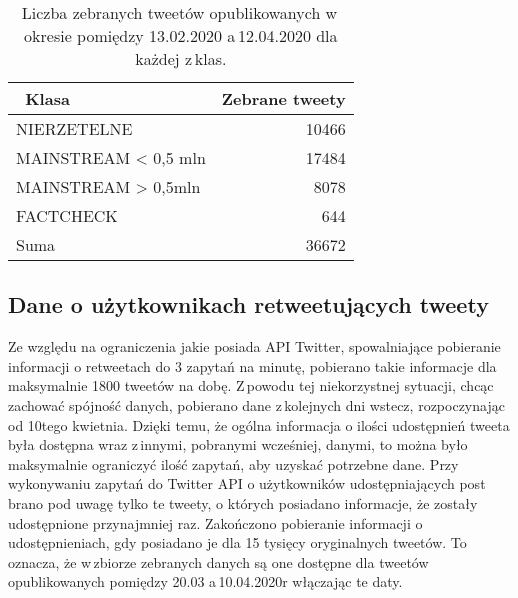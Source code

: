 \begin{table}[!h] \centering
\caption{Liczba zebranych tweetów opublikowanych w\,okresie pomiędzy 13.02.2020 a\,12.04.2020 dla każdej z\,klas.}  \label{tab:zebranetweety}
\begin{tabular}{|l|r|} 
\hline
~Klasa & Zebrane tweety \\ 
\hline \hline
NIERZETELNE & 10466 \\ 
\hline
MAINSTREAM \textless{} 0,5 mln & 17484 \\ 
\hline
MAINSTREAM \textgreater{} 0,5mln & 8078 \\ 
\hline
FACTCHECK & 644 \\
\hline 
Suma & 36672 \\
\hline 
\end{tabular}

\end{table}

\subsection{Dane o użytkownikach retweetujących tweety}
Ze względu na ograniczenia jakie posiada API Twitter, spowalniające pobieranie informacji o retweetach do 3 zapytań na minutę, pobierano takie informacje dla maksymalnie 1800 tweetów na dobę. Z\,powodu tej niekorzystnej sytuacji, chcąc zachować spójność danych, pobierano dane z\,kolejnych dni wstecz, rozpoczynając od 10tego kwietnia. Dzięki temu, że ogólna informacja o ilości udostępnień tweeta była dostępna wraz z\,innymi, pobranymi wcześniej, danymi, to można było maksymalnie ograniczyć ilość zapytań, aby uzyskać potrzebne dane. Przy wykonywaniu zapytań do Twitter API o użytkowników udostępniających post brano pod uwagę tylko te tweety, o których posiadano informacje, że zostały udostępnione przynajmniej raz. Zakończono pobieranie informacji o udostępnieniach, gdy posiadano je dla 15 tysięcy oryginalnych tweetów. To oznacza, że w\,zbiorze zebranych danych są one dostępne dla tweetów opublikowanych pomiędzy 20.03 a\,10.04.2020r włączając te daty.  